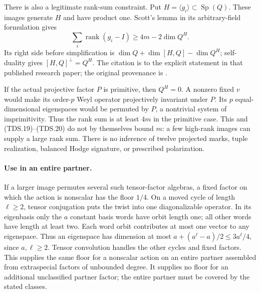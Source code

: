 There is also a legitimate rank-sum constraint.  Put
\(H=\langle g_i\rangle\subset\operatorname{Sp}(Q)\).
These images generate \(H\) and have product one.
Scott's lemma in its arbitrary-field formulation
\cite[Lemma2.3, author version p.~7]{TD:GuralnickMaroti2011} gives
\[
              \sum_i\operatorname{rank}(g_i-I)
                        \ge4m-2\dim Q^H.
 \tag{TDS.21}
\]
Its right side before simplification is
\(\dim Q+\dim[H,Q]-\dim Q^H\); self-duality gives
\([H,Q]^\perp=Q^H\).
The citation is to the explicit statement in that published research
paper; the original provenance is \cite{TD:Scott1977}.

If the actual projective factor \(P\) is primitive, then \(Q^H=0\).
A nonzero fixed \(v\) would make its order-\(p\) Weyl operator
projectively invariant under \(P\).  Its \(p\) equal-dimensional
eigenspaces would be permuted by \(P\), a nontrivial system of
imprimitivity.  Thus the rank sum is at least \(4m\) in the
primitive case.
This and (TDS.19)--(TDS.20) do not by themselves bound \(m\):
a few high-rank images can supply a large rank sum.
There is no inference of twelve projected marks, tuple realization,
balanced Hodge signature, or prescribed polarization.

\paragraph{Use in an entire partner.}
If a larger image permutes several such tensor-factor algebras,
a fixed factor on which the action is nonscalar has the floor \(1/4\).
On a moved cycle of length \(\ell\ge2\), tensor conjugation puts
the twist into one diagonalizable operator.
In its eigenbasis only the \(a\) constant basis words have orbit
length one; all other words have length at least two.
Each word orbit contributes at most one vector to any eigenspace.
Thus an eigenspace has dimension at most
\(a+(a^\ell-a)/2\le3a^\ell/4\), since \(a,\ell\ge2\).
Tensor convolution handles the other cycles and fixed factors.
This supplies the same floor for a nonscalar action on an entire
partner assembled from extraspecial factors of unbounded degree.
It supplies no floor for an additional unclassified partner factor;
the entire partner must be covered by the stated classes.
